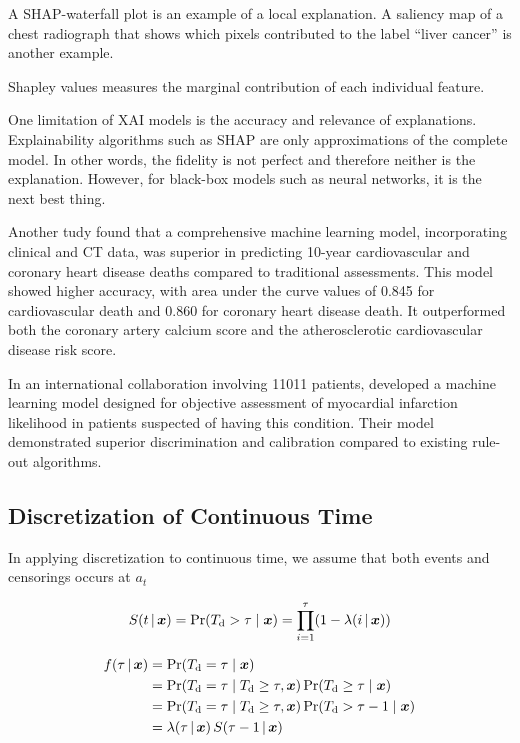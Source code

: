 A SHAP-waterfall plot is an example of a local explanation.
A saliency map of a chest radiograph that shows
which pixels contributed to the label \enquote{liver cancer}
is another example.

Shapley values measures the marginal contribution
of each individual feature.


One limitation of XAI models is the accuracy and relevance of explanations.
Explainability algorithms such as SHAP are only approximations
of the complete model.
In other words, the fidelity is not perfect and therefore neither
is the explanation.
However, for black-box models such as neural networks,
it is the next best thing.

Another tudy found that a comprehensive machine learning model, incorporating
clinical and CT data, was superior in predicting 10-year cardiovascular and
coronary heart disease deaths compared to traditional assessments. This model
showed higher accuracy, with area under the curve values of 0.845 for
cardiovascular death and 0.860 for coronary heart disease death. It
outperformed both the coronary artery calcium score and the atherosclerotic
cardiovascular disease risk score.
~\autocite{nakanishiMachine2021}

In an international collaboration involving \num{11011} patients, \citeauthor{thanMachine2019} developed a machine learning model 
designed for objective assessment of myocardial infarction likelihood 
in patients suspected of having this condition. 
Their model demonstrated superior discrimination and calibration 
compared to existing rule-out algorithms.
~\autocite{thanMachine2019}


\subsection{Discretization of Continuous Time}

In applying discretization to continuous time, 
we assume that both events and censorings occurs at 
\(a_t\)


\begin{equation}
    S(t \,|\, \bm{x}) = \operatorname{\Pr}({T_{\mathrm{d}}} > \tau \mid \bm{x}) = 
    \prod_{i=1}^{\tau} (1 - \lambda(i \,|\, \bm{x}))
\end{equation}

\begin{equation}
    \begin{aligned}
    f(\tau \,|\, \bm{x}) 
    &= \operatorname{\Pr} ({T_{\mathrm{d}}} = \tau \mid \bm{x}) \\
    &= \operatorname{\Pr} ({T_{\mathrm{d}}} = \tau \mid {T_{\mathrm{d}}} \geq \tau, \bm{x}) 
       \operatorname{\Pr} ({T_{\mathrm{d}}}  \geq \tau \mid \bm{x}) \\
    &= \operatorname{\Pr} ({T_{\mathrm{d}}} = \tau \mid {T_{\mathrm{d}}} \geq \tau, \bm{x}) 
       \operatorname{\Pr} ({T_{\mathrm{d}}}  > \tau - 1 \mid \bm{x}) \\
    &= \lambda (\tau \,|\, \bm{x}) \, S(\tau - 1 \,|\, \bm{x})
    \end{aligned}
\end{equation}

